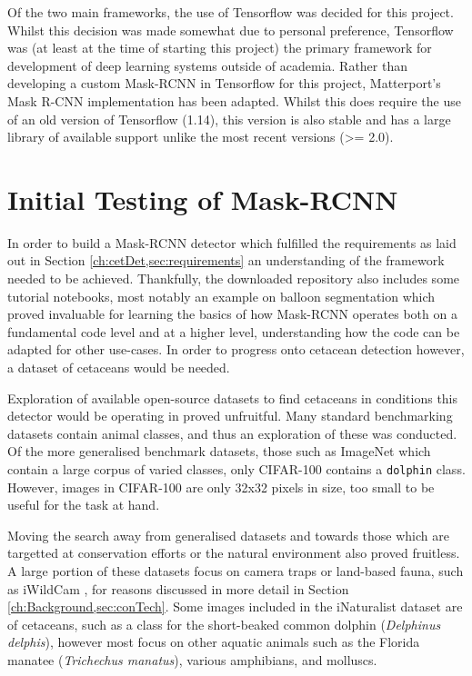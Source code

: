 Of the two main frameworks, the use of Tensorflow was decided for this project. Whilst this decision was made somewhat due to personal preference, Tensorflow was (at least at the time of starting this project) the primary framework for development of deep learning systems outside of academia. Rather than developing a custom Mask-RCNN in Tensorflow for this project, Matterport's Mask R-CNN implementation \cite{waleed_mask_2017} has been adapted. Whilst this does require the use of an old version of Tensorflow (1.14), this version is also stable and has a large library of available support unlike the most recent versions (>= 2.0).

\section{Initial Testing of Mask-RCNN}\label{ch:cetDet,sec:initialTesting}

In order to build a Mask-RCNN detector which fulfilled the requirements as laid out in Section \ref{ch:cetDet,sec:requirements} an understanding of the framework needed to be achieved. Thankfully, the downloaded repository also includes some tutorial notebooks, most notably an example on balloon segmentation which proved invaluable for learning the basics of how Mask-RCNN operates both on a fundamental code level and at a higher level, understanding how the code can be adapted for other use-cases. In order to progress onto cetacean detection however, a dataset of cetaceans would be needed. 

Exploration of available open-source datasets to find cetaceans in conditions this detector would be operating in proved unfruitful. Many standard benchmarking datasets contain animal classes, and thus an exploration of these was conducted. Of the more generalised benchmark datasets, those such as ImageNet \cite{deng_imagenet:_2009} which contain a large corpus of varied classes, only CIFAR-100 \cite{krizhevsky_learning_2009} contains a \texttt{dolphin} class. However, images in CIFAR-100 are only 32x32 pixels in size, too small to be useful for the task at hand. 

Moving the search away from generalised datasets and towards those which are targetted at conservation efforts or the natural environment also proved fruitless. A large portion of these datasets focus on camera traps or land-based fauna, such as iWildCam \cite{beery_iwildcam_2019}, for reasons discussed in more detail in Section \ref{ch:Background,sec:conTech}. Some images included in the iNaturalist dataset \cite{van_horn_inaturalist_2018} are of cetaceans, such as a class for the short-beaked common dolphin (\textit{Delphinus delphis}), however most focus on other aquatic animals such as the Florida manatee (\textit{Trichechus manatus}), various amphibians, and molluscs. 

